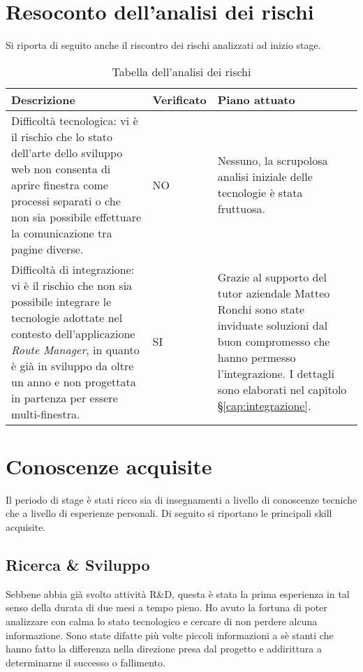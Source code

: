 \section{Resoconto dell'analisi dei rischi}

Si riporta di seguito anche il riscontro dei rischi analizzati ad inizio stage.

\begin{table}[H]
\small
\begin{tabular}{ |p{4.5cm} |p{1.75cm} |p{6.5cm}|}
\hline
\textbf{Descrizione} & \textbf{Verificato} & \textbf{Piano attuato} \\ \hline
Difficoltà tecnologica: vi è il rischio che lo stato dell'arte dello sviluppo web non consenta di aprire finestra come processi separati o che non sia possibile effettuare la comunicazione tra pagine diverse. & NO & Nessuno, la scrupolosa analisi iniziale delle tecnologie è stata fruttuosa. \\ \hline

Difficoltà di integrazione: vi è il rischio che non sia possibile integrare le tecnologie adottate nel contesto dell'applicazione \textit{Route Manager}, in quanto è già in sviluppo da oltre un anno e non progettata in partenza per essere multi-finestra. & SI & Grazie al supporto del tutor aziendale Matteo Ronchi sono state inviduate soluzioni dal buon compromesso che hanno permesso l'integrazione. I dettagli sono elaborati nel capitolo §\ref{cap:integrazione}. \\ \hline
\end{tabular}
\caption{Tabella dell'analisi dei rischi}
\end{table}

\section{Conoscenze acquisite}

Il periodo di stage è stati ricco sia di insegnamenti a livello di conoscenze tecniche che a livello di esperienze personali. Di seguito si riportano le principali skill acquisite.

\subsection{Ricerca \& Sviluppo}

Sebbene abbia già svolto attività R\&D, questa è stata la prima esperienza in tal senso della durata di due mesi a tempo pieno. Ho avuto la fortuna di poter analizzare con calma lo stato tecnologico e cercare di non perdere alcuna informazione. Sono state difatte più volte piccoli informazioni a sè stanti che hanno fatto la differenza nella direzione presa dal progetto e addirittura a determinarne il successo o fallimento.

